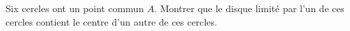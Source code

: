 Six cercles ont un point commun $A$. Montrer que le disque limité par l'un de ces cercles contient le centre d'un autre de ces cercles.
